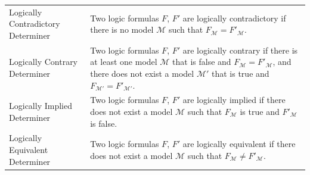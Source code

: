\documentclass[ms]{uncgdissertationexp2}
\theoremstyle{plain}
\theoremstyle{definition}
\theoremstyle{remark}
\begin{document}
\begin{table}
\begin{tabular}{p{3cm}p{11cm}}
	  Logically Contradictory Determiner&Two logic formulas $F$, $F'$ are logically contradictory if there is no model $\mathcal{M}$ such that $F_{\mathcal{M}} = F'_{\mathcal{M}}.$\\
	  Logically Contrary Determiner&Two logic formulas $F$, $F'$ are logically contrary if there is at least one model $\mathcal{M}$ that is false and $F_{\mathcal{M}} = F'_{\mathcal{M}}$, and there does not exist a model $\mathcal{M'}$ that is true and $F_{\mathcal{M'}} = F'_{\mathcal{M'}}$.\\
	  Logically Implied Determiner&Two logic formulas $F$, $F'$ are logically implied if there does not exist a model $\mathcal{M}$ such that $F_{\mathcal{M}}$ is true and $F'_{\mathcal{M}}$ is false.\\
	  Logically Equivalent Determiner&Two logic formulas $F$, $F'$ are logically equivalent if there does not exist a model $\mathcal{M}$ such that $F_{\mathcal{M}} \neq F'_{\mathcal{M}}$.\\
	\bottomrule
  \end{tabular}
\end{table}
\end{document}
